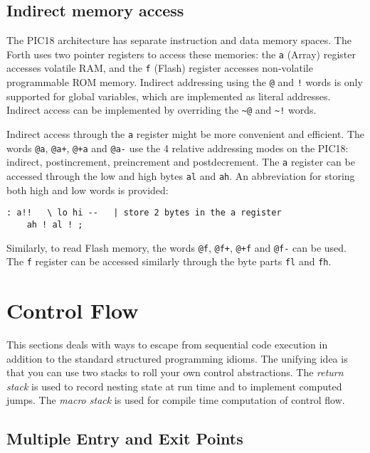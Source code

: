 \documentclass[12pt]{article}
\begin{document}
\subsection{Indirect memory access}

The PIC18 architecture has separate instruction and data memory
spaces. The Forth uses two pointer registers to access these memories:
the \verb|a| (Array) register accesses volatile RAM, and the \verb|f|
(Flash) register accesses non-volatile programmable ROM
memory. Indirect addressing using the \verb|@| and \verb|!| words is
only supported for global variables, which are implemented as literal
addresses. Indirect access can be implemented by overriding the
\verb|~@| and \verb|~!| words.

Indirect access through the \verb|a| register might be more convenient
and efficient. The words \verb|@a|, \verb|@a+|, \verb|@+a| and
\verb|@a-| use the 4 relative addressing modes on the PIC18: indirect,
postincrement, preincrement and postdecrement. The \verb|a| register
can be accessed through the low and high bytes \verb|al| and
\verb|ah|. An abbreviation for storing both high and low words is
provided:
\begin{verbatim}
: a!!   \ lo hi --   | store 2 bytes in the a register
    ah ! al ! ;
\end{verbatim}

Similarly, to read Flash memory, the words \verb|@f|, \verb|@f+|,
\verb|@+f| and \verb|@f-| can be used. The \verb|f| register can be
accessed similarly through the byte parts \verb|fl| and \verb|fh|.



\section{Control Flow}

This sections deals with ways to escape from sequential code execution
in addition to the standard structured programming idioms. The
unifying idea is that you can use two stacks to roll your own control
abstractions. The \emph{return stack} is used to record nesting state
at run time and to implement computed jumps.  The \emph{macro stack}
is used for compile time computation of control flow.

\subsection{Multiple Entry and Exit Points}
\end{document}
